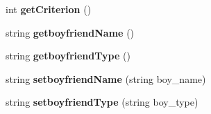\begin{DoxyCompactItemize}
\item 
int {\bfseries get\+Criterion} ()\hypertarget{class_girl_a726b1f49dce0b18b2296bb7c61c753ed}{}\label{class_girl_a726b1f49dce0b18b2296bb7c61c753ed}

\item 
string {\bfseries getboyfriend\+Name} ()\hypertarget{class_girl_af97fb7af1378f7cf3b73fb28cabfedad}{}\label{class_girl_af97fb7af1378f7cf3b73fb28cabfedad}

\item 
string {\bfseries getboyfriend\+Type} ()\hypertarget{class_girl_a959beee0d3f528ff6a9e3f39af45825f}{}\label{class_girl_a959beee0d3f528ff6a9e3f39af45825f}

\item 
string {\bfseries setboyfriend\+Name} (string boy\+\_\+name)\hypertarget{class_girl_aa98f922523058137144a12fe19a268b2}{}\label{class_girl_aa98f922523058137144a12fe19a268b2}

\item 
string {\bfseries setboyfriend\+Type} (string boy\+\_\+type)\hypertarget{class_girl_addf49e69d57de681d7fe0d6686a0503f}{}\label{class_girl_addf49e69d57de681d7fe0d6686a0503f}

\end{DoxyCompactItemize}
